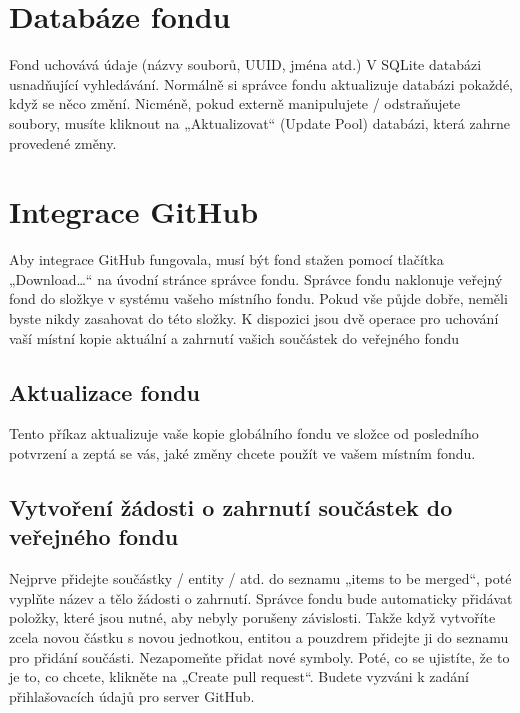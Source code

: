 \documentclass[letterpaper,10pt,czech]{sphinxmanual}
\begin{document}
\section{Databáze fondu}
\label{\detokenize{pool-mgr:databaze-fondu}}
Fond uchovává údaje (názvy souborů, UUID, jména atd.) V SQLite
databázi usnadňující vyhledávání. Normálně si správce fondu aktualizuje
databázi pokaždé, když se něco změní. Nicméně, pokud
externě manipulujete / odstraňujete soubory, musíte kliknout na „Aktualizovat“ (Update
Pool) databázi, která zahrne provedené změny.


\section{Integrace GitHub}
\label{\detokenize{pool-mgr:integrace-github}}
Aby integrace GitHub fungovala, musí být fond stažen pomocí
tlačítka „Download…“ na úvodní stránce správce fondu. Správce fondu naklonuje veřejný fond do složkye  v systému vašeho místního fondu. Pokud vše půjde dobře, neměli byste nikdy zasahovat do této složky. K dispozici jsou dvě operace pro uchování vaší místní kopie
aktuální a zahrnutí vašich součástek do veřejného fondu


\subsection{Aktualizace fondu}
\label{\detokenize{pool-mgr:aktualizace-fondu}}
Tento příkaz aktualizuje vaše kopie globálního fondu ve složce 
od posledního potvrzení a zeptá se vás, jaké změny chcete
použít ve vašem místním fondu.


\subsection{Vytvoření žádosti o zahrnutí součástek do veřejného fondu}
\label{\detokenize{pool-mgr:vytvoreni-zadosti-o-zahrnuti-soucastek-do-verejneho-fondu}}
Nejprve přidejte součástky / entity / atd. do seznamu „items to be merged“,
poté vyplňte název a tělo žádosti o zahrnutí. Správce fondu bude
automaticky přidávat položky, které jsou nutné, aby nebyly porušeny závislosti. Takže když
vytvoříte zcela novou částku s novou jednotkou, entitou a pouzdrem
přidejte ji do seznamu pro přidání součásti. Nezapomeňte přidat nové
symboly. Poté, co se ujistíte, že to je to, co chcete, klikněte na „Create
pull request“. Budete vyzváni k zadání přihlašovacích údajů pro server GitHub.
\end{document}
